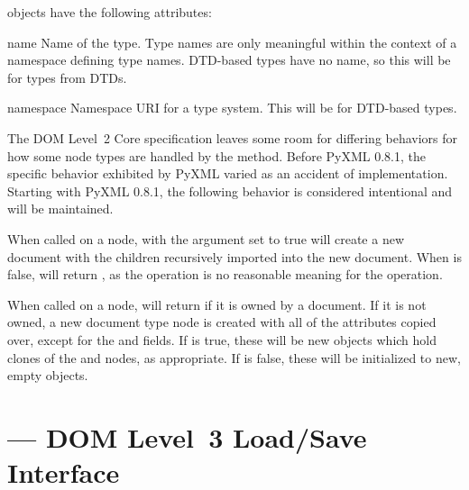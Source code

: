 \documentclass{howto}
\begin{document}
 objects have the following attributes:

\begin{memberdesc}[TypeInfo]{name}
  Name of the type.  Type names are only meaningful within the context
  of a namespace defining type names.  DTD-based types have no name,
  so this will be  for types from DTDs.
\end{memberdesc}

\begin{memberdesc}[TypeInfo]{namespace}
  Namespace URI for a type system.  This will be  for
  DTD-based types.
\end{memberdesc}


 The DOM Level~2 Core
specification leaves some room for differing behaviors for how some
node types are handled by the  method.
Before PyXML 0.8.1, the specific behavior exhibited by PyXML varied as
an accident of implementation.  Starting with PyXML 0.8.1, the
following behavior is considered intentional and will be maintained.

When called on a  node,  with the
 argument set to true will create a new document with the
children recursively imported into the new document.  When 
is false,  will return , as the
operation is no reasonable meaning for the operation.

When called on a  node,  will
return  if it is owned by a document.  If it is not owned,
a new document type node is created with all of the attributes copied
over, except for the  and  fields.
If  is true, these will be new  objects
which hold clones of the  and  nodes, as
appropriate.  If  is false, these will be initialized to
new, empty  objects.



\section{ ---
         DOM Level~3 Load/Save Interface}

\end{document}
